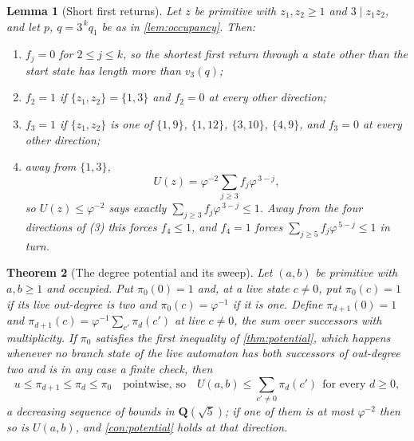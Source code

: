 \documentclass[11pt]{amsart}
\newtheorem{theorem}{Theorem}[section]
\newtheorem{lemma}[theorem]{Lemma}
\theoremstyle{definition}
\theoremstyle{remark}
\begin{document}
\begin{lemma}[Short first returns]
\label{lem:short}
Let $z$ be primitive with $z_1,z_2\ge 1$ and $3\mid z_1z_2$, and let $p$, $q=3^{\,k}q_1$ be as in \cref{lem:occupancy}. Then:
\begin{enumerate}
\item $f_j=0$ for $2\le j\le k$, so the shortest first return through a state other than the start state has length more than $v_3(q)$;
\item $f_2=1$ if $\{z_1,z_2\}=\{1,3\}$ and $f_2=0$ at every other direction;
\item $f_3=1$ if $\{z_1,z_2\}$ is one of $\{1,9\}$, $\{1,12\}$, $\{3,10\}$, $\{4,9\}$, and $f_3=0$ at every other direction;
\item away from $\{1,3\}$,
\[
U(z)=\varphi^{-2}\sum_{j\ge 3}f_j\varphi^{\,3-j},
\]
so $U(z)\le\varphi^{-2}$ says exactly $\sum_{j\ge 3}f_j\varphi^{\,3-j}\le 1$. Away from the four directions of (3) this forces $f_4\le 1$, and $f_4=1$ forces $\sum_{j\ge 5}f_j\varphi^{\,5-j}\le 1$ in turn.
\end{enumerate}
\end{lemma}

\begin{theorem}[The degree potential and its sweep]
\label{thm:degree}
Let $(a,b)$ be primitive with $a,b\ge 1$ and occupied. Put $\pi_0(0)=1$ and, at a live state $c\neq 0$, put $\pi_0(c)=1$ if its live out-degree is two and $\pi_0(c)=\varphi^{-1}$ if it is one. Define $\pi_{d+1}(0)=1$ and $\pi_{d+1}(c)=\varphi^{-1}\sum_{c'}\pi_d(c')$ at live $c\neq 0$, the sum over successors with multiplicity. If $\pi_0$ satisfies the first inequality of \cref{thm:potential}, which happens whenever no branch state of the live automaton has both successors of out-degree two and is in any case a finite check, then
\[
u\le\pi_{d+1}\le\pi_d\le\pi_0
\quad\text{pointwise, so}\quad
U(a,b)\le\sum_{c'\neq 0}\pi_d(c')\ \ \text{for every }d\ge 0,
\]
a decreasing sequence of bounds in $\mathbf{Q}(\sqrt5)$; if one of them is at most $\varphi^{-2}$ then so is $U(a,b)$, and \cref{con:potential} holds at that direction.
\end{theorem}
\end{document}
